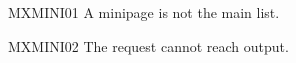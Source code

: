 \documentclass[twocolumn]{article}
\begin{document}
\noindent\begin{minipage}{\columnwidth}
\mbox{MXMINI01} A minipage is not the main list.
\begin{wideband}
\end{wideband}
\mbox{MXMINI02} The request cannot reach output.
\end{minipage}
\end{document}
